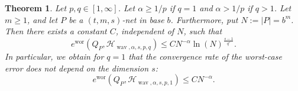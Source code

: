 \documentclass[12pt]{article}
\DeclareMathOperator{\wav}{wav}
\DeclareMathOperator{\wor}{wor}
\newtheorem{theorem}{Theorem}
\newcommand{\HH}{\mathcal{H}}
\begin{document}
\begin{theorem}\label{Nets}
Let $p,q\in [1,\infty]$. Let $\alpha \ge 1/p$ if $q=1$ and $\alpha > 1/p$ if $q>1$.
Let $m\ge 1$, and let $P$ be a $(t,m,s)$-net in base $b$. 
Furthermore, put $N:=|P|=b^{m}$.
Then there exists a constant $C$, independent of $N$, such that
\begin{equation}
 \label{nets}
e^{\wor}(Q_P, \HH_{\wav,\alpha,s,p,q})
\le C N^{-\alpha}
\ln(N)^{\frac{s-1}{q'}}.
\end{equation}
In particular, we obtain for $q=1$ that the convergence rate of the worst-case error does not depend on the dimension $s$:
\begin{equation}
 \label{nets_q=1}
e^{\wor}(Q_P, \HH_{\wav,\alpha,s,p,1})
\le C N^{-\alpha}.
\end{equation}
\end{theorem}
\end{document}
